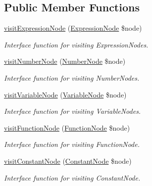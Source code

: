 \subsection*{Public Member Functions}
\begin{DoxyCompactItemize}
\item 
\hyperlink{interfaceMathParser_1_1Interpreting_1_1Visitors_1_1Visitor_a201489f6ae0ccc3c25ff153a57994fa1}{visit\-Expression\-Node} (\hyperlink{classMathParser_1_1Parsing_1_1Nodes_1_1ExpressionNode}{Expression\-Node} \$node)
\begin{DoxyCompactList}\small\item\em Interface function for visiting Expression\-Nodes. \end{DoxyCompactList}\item 
\hyperlink{interfaceMathParser_1_1Interpreting_1_1Visitors_1_1Visitor_acbcd1cbecf76ba51c893a49746162dc1}{visit\-Number\-Node} (\hyperlink{classMathParser_1_1Parsing_1_1Nodes_1_1NumberNode}{Number\-Node} \$node)
\begin{DoxyCompactList}\small\item\em Interface function for visiting Number\-Nodes. \end{DoxyCompactList}\item 
\hyperlink{interfaceMathParser_1_1Interpreting_1_1Visitors_1_1Visitor_a292630a7204dadd96877d8182f38deb0}{visit\-Variable\-Node} (\hyperlink{classMathParser_1_1Parsing_1_1Nodes_1_1VariableNode}{Variable\-Node} \$node)
\begin{DoxyCompactList}\small\item\em Interface function for visiting Variable\-Nodes. \end{DoxyCompactList}\item 
\hyperlink{interfaceMathParser_1_1Interpreting_1_1Visitors_1_1Visitor_a497e4a990f99689616c25e76b0ec6ef1}{visit\-Function\-Node} (\hyperlink{classMathParser_1_1Parsing_1_1Nodes_1_1FunctionNode}{Function\-Node} \$node)
\begin{DoxyCompactList}\small\item\em Interface function for visiting Function\-Node. \end{DoxyCompactList}\item 
\hyperlink{interfaceMathParser_1_1Interpreting_1_1Visitors_1_1Visitor_ac694089225b20c9f848bcfb0a5e600f0}{visit\-Constant\-Node} (\hyperlink{classMathParser_1_1Parsing_1_1Nodes_1_1ConstantNode}{Constant\-Node} \$node)
\begin{DoxyCompactList}\small\item\em Interface function for visiting Constant\-Node. \end{DoxyCompactList}\end{DoxyCompactItemize}


